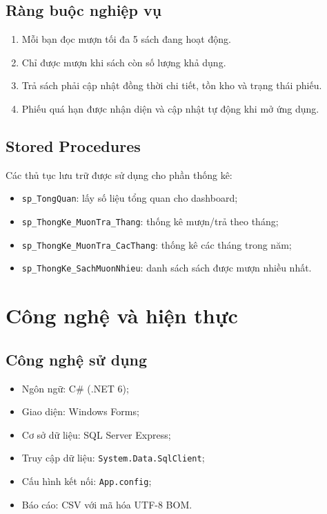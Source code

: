 \documentclass[12pt,a4paper]{article}
\begin{document}
\subsection{Ràng buộc nghiệp vụ}
\begin{enumerate}[leftmargin=1.5cm]
    \item Mỗi bạn đọc mượn tối đa 5 sách đang hoạt động.
    \item Chỉ được mượn khi sách còn số lượng khả dụng.
    \item Trả sách phải cập nhật đồng thời chi tiết, tồn kho và trạng thái phiếu.
    \item Phiếu quá hạn được nhận diện và cập nhật tự động khi mở ứng dụng.
\end{enumerate}

\subsection{Stored Procedures}
Các thủ tục lưu trữ được sử dụng cho phần thống kê:
\begin{itemize}[leftmargin=1.5cm]
    \item \texttt{sp\_TongQuan}: lấy số liệu tổng quan cho dashboard;
    \item \texttt{sp\_ThongKe\_MuonTra\_Thang}: thống kê mượn/trả theo tháng;
    \item \texttt{sp\_ThongKe\_MuonTra\_CacThang}: thống kê các tháng trong năm;
    \item \texttt{sp\_ThongKe\_SachMuonNhieu}: danh sách sách được mượn nhiều nhất.
\end{itemize}

\section{Công nghệ và hiện thực}
\subsection{Công nghệ sử dụng}
\begin{itemize}[leftmargin=1.5cm]
    \item Ngôn ngữ: C\# (.NET 6);
    \item Giao diện: Windows Forms;
    \item Cơ sở dữ liệu: SQL Server Express;
    \item Truy cập dữ liệu: \texttt{System.Data.SqlClient};
    \item Cấu hình kết nối: \texttt{App.config};
    \item Báo cáo: CSV với mã hóa UTF-8 BOM.
\end{itemize}
\end{document}
